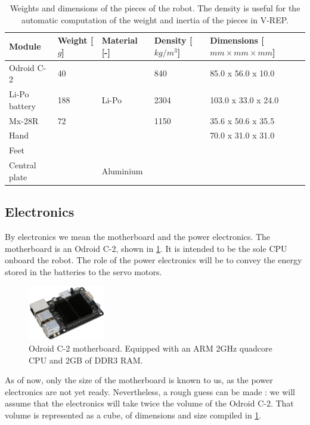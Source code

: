 \begin{table}[htp]
\center
\begin{tabularx}{\textwidth}{@{} l X X X p{3.5cm} @{}}
\toprule
\textbf{Module} & \textbf{Weight [$g$]} & \textbf{Material [-]} &  \textbf{Density [$kg/m^3$]}& \textbf{Dimensions [$mm \times mm \times mm$]}\\ 
\midrule
Odroid C-2 & 40 & & 840 & 85.0 x 56.0 x 10.0\\
Li-Po battery & 188 & Li-Po & 2304 & 103.0 x 33.0 x 24.0\\
Mx-28R & 72 & & 1150 & 35.6 x 50.6 x 35.5\\
Hand & & & & 70.0 x 31.0 x 31.0\\
Feet & & & & \\
Central plate & & Aluminium & & \\
\bottomrule
\end{tabularx}
\caption[Weights and dimensions of the pieces of the robot]{Weights and dimensions of the pieces of the robot. The density is useful for the automatic computation of the weight and inertia of the pieces in V-REP.}
\label{table:weights}
\end{table}

\subsection{Electronics}
By electronics we mean the motherboard and the power electronics. The motherboard is an Odroid C-2, shown in \cref{fig:electronics}. It is intended to be the sole CPU onboard the robot. The role of the power electronics will be to convey the energy stored in the batteries to the servo motors. 

\begin{figure}[htp]
\center
\includegraphics[width=0.3\textwidth]{figures/odroid-c2}
\caption[Odroid C-2]{Odroid C-2 motherboard. Equipped with an ARM 2GHz quadcore CPU and 2GB of DDR3 RAM.}
\label{fig:electronics}
\end{figure}

As of now, only the size of the motherboard is known to us, as the power electronics are not yet ready. Nevertheless, a rough guess can be made : we will assume that the electronics will take twice the volume of the Odroid C-2. That volume is represented as a cube, of dimensions and size compiled in \cref{table:weights}.

